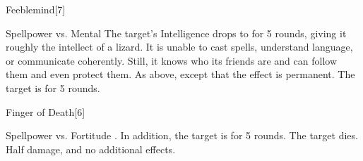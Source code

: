 \begin{spellsection}{Feeblemind}[7]
    \begin{spellheader}
    \end{spellheader}
    \begin{spellcontent}
        \begin{spelltargetinginfo}
        \end{spelltargetinginfo}
        \begin{spelleffects}
            \begin{spellattack}{Spellpower vs. Mental}
                \spellsuccess The target's Intelligence drops to  for 5 rounds, giving it roughly the intellect of a lizard. It is unable to cast spells, understand language, or communicate coherently. Still, it knows who its friends are and can follow them and even protect them.
                \spellcritical As above, except that the effect is permanent.
                \spellfailure The target is \dazed for 5 rounds.
            \end{spellattack}
        \end{spelleffects}
    \end{spellcontent}
    \begin{spellfooter}
        \miscastrandom
    \end{spellfooter}
\end{spellsection}

\begin{spellsection}{Finger of Death}[6]
    \begin{spellheader}
    \end{spellheader}
    \begin{spellcontent}
        \begin{spelltargetinginfo}
        \end{spelltargetinginfo}
        \begin{spelleffects}
            \begin{spellattack}{Spellpower vs. Fortitude}
                \spellsuccess {}. In addition, the target is \staggered for 5 rounds.
                \spellcritical The target dies.
                \spellfailure Half damage, and no additional effects.
            \end{spellattack}
        \end{spelleffects}
    \end{spellcontent}
    \begin{spellfooter}
        \miscastrandom
    \end{spellfooter}
\end{spellsection}

